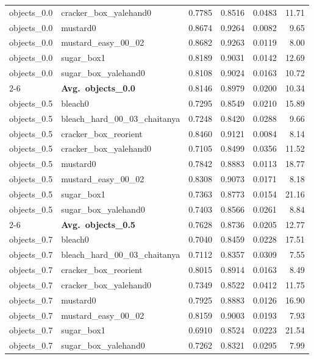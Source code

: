\begin{longtable}{llrrrr}
  objects_0.0 & cracker\_box\_yalehand0 & 0.7785 & 0.8516 & 0.0483 & 11.71 \\
  objects_0.0 & mustard0 & 0.8674 & 0.9264 & 0.0082 & 9.65 \\
  objects_0.0 & mustard\_easy\_00\_02 & 0.8682 & 0.9263 & 0.0119 & 8.00 \\
  objects_0.0 & sugar\_box1 & 0.8189 & 0.9031 & 0.0142 & 12.69 \\
  objects_0.0 & sugar\_box\_yalehand0 & 0.8108 & 0.9024 & 0.0163 & 10.72 \\
  \cmidrule{2-6}
  & \textbf{Avg.~objects_0.0} & 0.8146 & 0.8979 & 0.0200 & 10.34 \\
  \midrule
  objects_0.5 & bleach0 & 0.7295 & 0.8549 & 0.0210 & 15.89 \\
  objects_0.5 & bleach\_hard\_00\_03\_chaitanya & 0.7248 & 0.8420 & 0.0288 & 9.66 \\
  objects_0.5 & cracker\_box\_reorient & 0.8460 & 0.9121 & 0.0084 & 8.14 \\
  objects_0.5 & cracker\_box\_yalehand0 & 0.7105 & 0.8499 & 0.0356 & 11.52 \\
  objects_0.5 & mustard0 & 0.7842 & 0.8883 & 0.0113 & 18.77 \\
  objects_0.5 & mustard\_easy\_00\_02 & 0.8308 & 0.9073 & 0.0171 & 8.18 \\
  objects_0.5 & sugar\_box1 & 0.7363 & 0.8773 & 0.0154 & 21.16 \\
  objects_0.5 & sugar\_box\_yalehand0 & 0.7403 & 0.8566 & 0.0261 & 8.84 \\
  \cmidrule{2-6}
  & \textbf{Avg.~objects_0.5} & 0.7628 & 0.8736 & 0.0205 & 12.77 \\
  \midrule
  objects_0.7 & bleach0 & 0.7040 & 0.8459 & 0.0228 & 17.51 \\
  objects_0.7 & bleach\_hard\_00\_03\_chaitanya & 0.7112 & 0.8357 & 0.0309 & 7.55 \\
  objects_0.7 & cracker\_box\_reorient & 0.8015 & 0.8914 & 0.0163 & 8.49 \\
  objects_0.7 & cracker\_box\_yalehand0 & 0.7349 & 0.8522 & 0.0412 & 11.75 \\
  objects_0.7 & mustard0 & 0.7925 & 0.8883 & 0.0126 & 16.90 \\
  objects_0.7 & mustard\_easy\_00\_02 & 0.8159 & 0.9003 & 0.0193 & 7.93 \\
  objects_0.7 & sugar\_box1 & 0.6910 & 0.8524 & 0.0223 & 21.54 \\
  objects_0.7 & sugar\_box\_yalehand0 & 0.7262 & 0.8321 & 0.0295 & 7.99 \\

\end{longtable}
